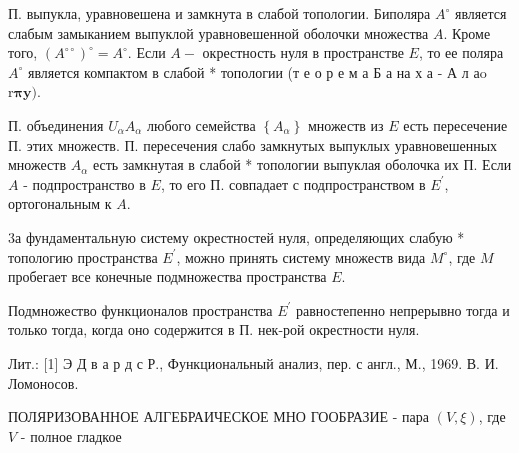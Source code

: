 \documentclass[10pt]{article}
\begin{document}
П. выпукла, уравновешена и замкнута в слабой топологии. Биполяра $A^{\circ}$ является слабым замыканием выпуклой уравновешенной оболочки множества $A$. Кроме того, $\left(A^{\circ \circ}\right)^{\circ}=A^{\circ}$. Если $A-$ окрестность нуля в пространстве $E$, то ее поляра $A^{\circ}$ является компактом в слабой * топологии (т е о р е м а Б а на х а - А л аo $\mathrm{r} \boldsymbol{\pi} \mathbf{y})$.



П. объединения $U_{\alpha} A_{\alpha}$ любого семейства $\left\{A_{\alpha}\right\}$ множеств из $E$ есть пересечение П. этих множеств. П. пересечения слабо замкнутых выпуклых уравновешенных множеств $A_{\alpha}$ есть замкнутая в слабой * топологии выпуклая оболочка их П. Если $A$ - подпространство в $E$, то его П. совпадает с подпространством в $E^{\prime}$, ортогональным к $A$.



3а фундаментальную систему окрестностей нуля, определяющих слабую * топологию пространства $E^{\prime}$, можно принять систему множеств вида $M^{\circ}$, где $M$ пробегает все конечные подмножества пространства $E$.



Подмножество функционалов пространства $E^{\prime}$ равностепенно непрерывно тогда и только тогда, когда оно содержится в П. нек-рой окрестности нуля.



Лит.: [1] Э Д в а р д с Р., Функциональный анализ, пер. с англ., М., 1969. В. И. Ломоносов.



ПОЛЯРИЗОВАННОЕ АЛГЕБРАИЧЕСКОЕ МНО ГООБРАЗИЕ - пара $(V, \xi)$, где $V$ - полное гладкое
\end{document}
